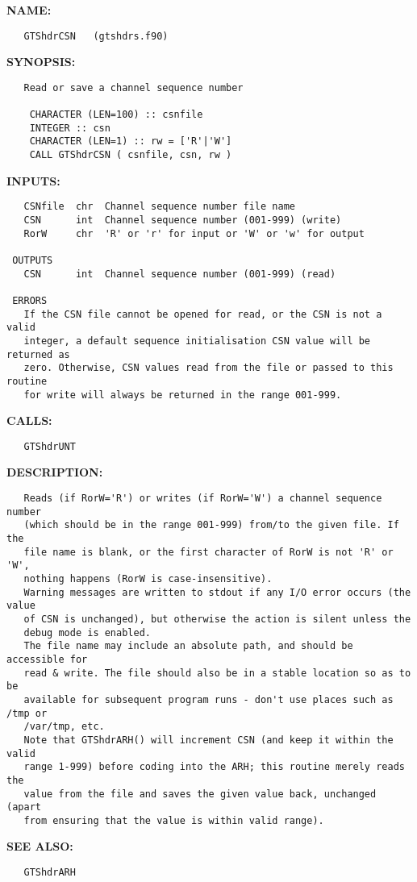 \label{ch:robo9}
\label{ch:BUFR_GTSHDRS_GTShdrCSN}
\textbf{NAME:}\hspace{0.08in}\begin{Verbatim}
   GTShdrCSN   (gtshdrs.f90)
\end{Verbatim}
\textbf{SYNOPSIS:}\hspace{0.08in}\begin{Verbatim}
   Read or save a channel sequence number

    CHARACTER (LEN=100) :: csnfile
    INTEGER :: csn
    CHARACTER (LEN=1) :: rw = ['R'|'W']
    CALL GTShdrCSN ( csnfile, csn, rw )
\end{Verbatim}
\textbf{INPUTS:}\hspace{0.08in}\begin{Verbatim}
   CSNfile  chr  Channel sequence number file name
   CSN      int  Channel sequence number (001-999) (write)
   RorW     chr  'R' or 'r' for input or 'W' or 'w' for output

 OUTPUTS
   CSN      int  Channel sequence number (001-999) (read)

 ERRORS
   If the CSN file cannot be opened for read, or the CSN is not a valid
   integer, a default sequence initialisation CSN value will be returned as
   zero. Otherwise, CSN values read from the file or passed to this routine
   for write will always be returned in the range 001-999.
\end{Verbatim}
\textbf{CALLS:}\hspace{0.08in}\begin{Verbatim}
   GTShdrUNT
\end{Verbatim}
\textbf{DESCRIPTION:}\hspace{0.08in}\begin{Verbatim}
   Reads (if RorW='R') or writes (if RorW='W') a channel sequence number
   (which should be in the range 001-999) from/to the given file. If the
   file name is blank, or the first character of RorW is not 'R' or 'W',
   nothing happens (RorW is case-insensitive).
   Warning messages are written to stdout if any I/O error occurs (the value
   of CSN is unchanged), but otherwise the action is silent unless the
   debug mode is enabled.
   The file name may include an absolute path, and should be accessible for
   read & write. The file should also be in a stable location so as to be
   available for subsequent program runs - don't use places such as /tmp or
   /var/tmp, etc.
   Note that GTShdrARH() will increment CSN (and keep it within the valid
   range 1-999) before coding into the ARH; this routine merely reads the
   value from the file and saves the given value back, unchanged (apart
   from ensuring that the value is within valid range).
\end{Verbatim}
\textbf{SEE ALSO:}\hspace{0.08in}\begin{Verbatim}
   GTShdrARH
\end{Verbatim}
